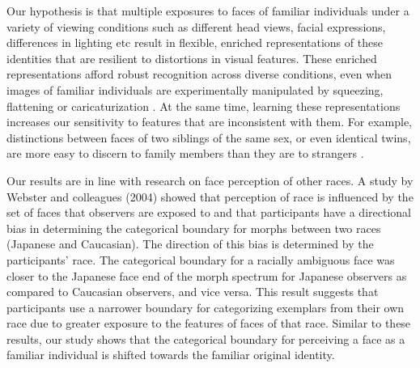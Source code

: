 \documentclass[10pt,letterpaper]{article}
\begin{document}
Our hypothesis is that multiple exposures to faces of familiar individuals under a variety of viewing conditions such as different head views, facial expressions, differences in lighting etc result in flexible, enriched representations of these identities that are resilient to distortions in visual features. These enriched representations afford robust recognition across diverse conditions, even when images of familiar individuals are experimentally manipulated by squeezing, flattening or caricaturization \cite{sinha2006face, gilad2018recognizing}. At the same time, learning these representations increases our sensitivity to features that are inconsistent with them. For example, distinctions between faces of two siblings of the same sex, or even identical twins, are more easy to discern to family members than they are to strangers \cite{stevenage1998twin}.

Our results are in line with research on face perception of other races. A study by Webster and colleagues (2004)\cite{webster2004adaptation} showed that perception of race is influenced by the set of faces that observers are exposed to and that participants have a directional bias in determining the categorical boundary for morphs between two races (Japanese and Caucasian). The direction of this bias is determined by the participants’ race. The categorical boundary for a racially ambiguous face was closer to the Japanese face end of the morph spectrum for Japanese observers as compared to Caucasian observers, and vice versa. This result suggests that participants use a narrower boundary for categorizing exemplars from their own race due to greater exposure to the features of faces of that race. Similar to these results, our study shows that the categorical boundary for perceiving a face as a familiar individual is shifted towards the familiar original identity. 
\end{document}
